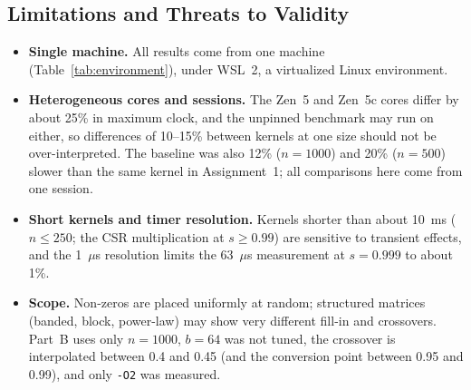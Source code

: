 \documentclass[conference,a4paper]{IEEEtran}
\newcommand{\code}[1]{\texttt{#1}}
\begin{document}
\subsection{Limitations and Threats to Validity}
\label{sec:limits}
\begin{itemize}[itemsep=1pt]
  \item \textbf{Single machine.} All results come from one machine
        (Table~\ref{tab:environment}), under WSL~2, a virtualized Linux
        environment.
  \item \textbf{Heterogeneous cores and sessions.} The Zen~5 and Zen~5c cores
        differ by about 25\% in maximum clock, and the unpinned benchmark may
        run on either, so differences of 10--15\% between kernels at one size
        should not be over-interpreted. The baseline was also 12\%
        ($n = 1000$) and 20\% ($n = 500$) slower than the same kernel in
        Assignment~1; all comparisons here come from one session.
  \item \textbf{Short kernels and timer resolution.} Kernels shorter than
        about 10~ms ($n \le 250$; the CSR multiplication at $s \ge 0.99$) are
        sensitive to transient effects, and the 1~$\mu$s resolution limits the
        63~$\mu$s measurement at $s = 0.999$ to about 1\%.
  \item \textbf{Scope.} Non-zeros are placed uniformly at random; structured
        matrices (banded, block, power-law) may show very different fill-in and
        crossovers. Part~B uses only $n = 1000$, $b = 64$ was not tuned, the
        crossover is interpolated between 0.4 and 0.45 (and the conversion
        point between 0.95 and 0.99), and only \code{-O2} was measured.
\end{itemize}

\end{document}
